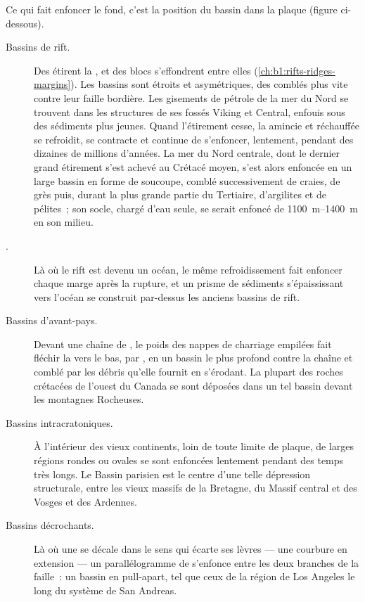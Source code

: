 Ce qui fait enfoncer le fond, c'est la position du bassin dans la plaque (figure
ci-dessous).

\begin{description}
  \item[Bassins de rift.] Des  étirent la , et des blocs s'effondrent entre
        elles (\cref{ch:b1:rifts-ridges-margins}). Les bassins sont étroits et
        asymétriques, des  comblés plus vite contre leur faille bordière. Les
        gisements de pétrole de la mer du Nord se trouvent dans les structures de ses fossés Viking et
        Central, enfouis sous des sédiments plus jeunes. Quand l'étirement
        cesse, la  amincie et réchauffée se refroidit, se contracte et continue de
        s'enfoncer, lentement, pendant des dizaines de millions d'années. La mer du Nord centrale,
        dont le dernier grand étirement s'est achevé au Crétacé moyen, s'est alors enfoncée en
        un large bassin en forme de soucoupe, comblé successivement de craies, de grès
        puis, durant la plus grande partie du Tertiaire, d'argilites et de pélites~; son socle,
        chargé d'eau seule, se serait enfoncé de \qtyrange{1100}{1400}{m} en son
        milieu.
  \item[.] Là où le rift est devenu un océan, le même refroidissement
        fait enfoncer chaque marge après la rupture, et un prisme de sédiments
        s'épaississant vers l'océan se construit par-dessus les anciens bassins de rift.
  \item[Bassins d'avant-pays.] Devant une chaîne de , le poids des
        nappes de charriage empilées fait fléchir la  vers le bas, par , en un bassin
        le plus profond contre la chaîne et comblé par les débris qu'elle fournit en s'érodant. La plupart
        des roches crétacées de l'ouest du Canada se sont déposées dans un tel bassin
        devant les montagnes Rocheuses.
  \item[Bassins intracratoniques.] À l'intérieur des vieux continents, loin de toute
        limite de plaque, de larges régions rondes ou ovales se sont enfoncées lentement pendant des
        temps très longs. Le Bassin parisien est le centre d'une telle dépression
        structurale, entre les vieux massifs de la Bretagne, du Massif central et
        des Vosges et des Ardennes.
  \item[Bassins décrochants.] Là où une  se décale dans le
        sens qui écarte ses lèvres --- une courbure en extension --- un parallélogramme
        de  s'enfonce entre les deux branches de la faille~: un bassin en pull-apart, tel
        que ceux de la région de Los Angeles le long du système de San Andreas.
\end{description}
